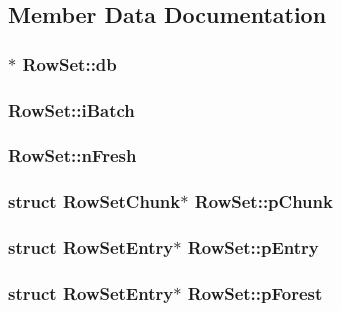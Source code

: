 \subsection{Member Data Documentation}
\hypertarget{struct_row_set_a7da847a06c2f90025fbd89c57516c6f6}{
\subsubsection[{db}]{$\ast$ Row\-Set\-::db}}\label{struct_row_set_a7da847a06c2f90025fbd89c57516c6f6}
\hypertarget{struct_row_set_af33d206290792936cb1ebbb8e03baf64}{
\subsubsection[{i\-Batch}]{ Row\-Set\-::i\-Batch}}\label{struct_row_set_af33d206290792936cb1ebbb8e03baf64}
\hypertarget{struct_row_set_a0ed2a47d6789a70081f3454ef2604e7f}{
\subsubsection[{n\-Fresh}]{ Row\-Set\-::n\-Fresh}}\label{struct_row_set_a0ed2a47d6789a70081f3454ef2604e7f}
\hypertarget{struct_row_set_af064f9ec7b1ba820a3d53622bde9d42f}{
\subsubsection[{p\-Chunk}]{\setlength{\rightskip}{0pt plus 5cm}struct {\bf Row\-Set\-Chunk}$\ast$ Row\-Set\-::p\-Chunk}}\label{struct_row_set_af064f9ec7b1ba820a3d53622bde9d42f}
\hypertarget{struct_row_set_a3eccaf69ad7863abae2541a7c0b94e1d}{
\subsubsection[{p\-Entry}]{\setlength{\rightskip}{0pt plus 5cm}struct {\bf Row\-Set\-Entry}$\ast$ Row\-Set\-::p\-Entry}}\label{struct_row_set_a3eccaf69ad7863abae2541a7c0b94e1d}
\hypertarget{struct_row_set_abe7ab16fffbe5992f637d6a17c6342ff}{
\subsubsection[{p\-Forest}]{\setlength{\rightskip}{0pt plus 5cm}struct {\bf Row\-Set\-Entry}$\ast$ Row\-Set\-::p\-Forest}}\label{struct_row_set_abe7ab16fffbe5992f637d6a17c6342ff}
